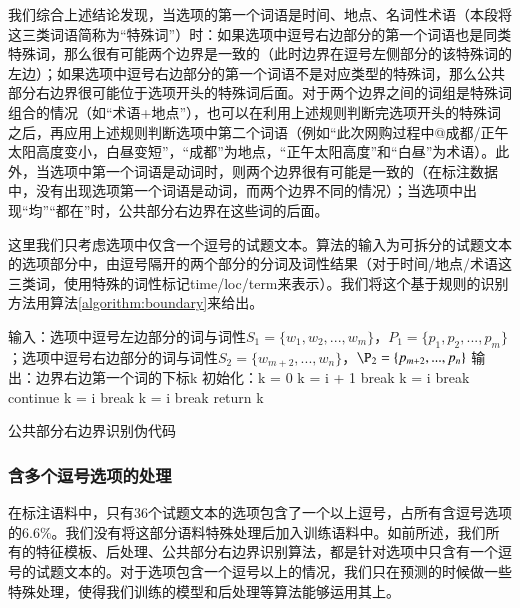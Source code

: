 \documentclass[master, winfont]{njuthesis}
\begin{document}
我们综合上述结论发现，当选项的第一个词语是时间、地点、名词性术语（本段将这三类词语简称为“特殊词”）时：如果选项中逗号右边部分的第一个词语也是同类特殊词，那么很有可能两个边界是一致的（此时边界在逗号左侧部分的该特殊词的左边）；如果选项中逗号右边部分的第一个词语不是对应类型的特殊词，那么公共部分右边界很可能位于选项开头的特殊词后面。对于两个边界之间的词组是特殊词组合的情况（如“术语+地点”），也可以在利用上述规则判断完选项开头的特殊词之后，再应用上述规则判断选项中第二个词语（例如“此次网购过程中@成都/正午太阳高度变小，白昼变短”，“成都”为地点，“正午太阳高度”和“白昼”为术语）。此外，当选项中第一个词语是动词时，则两个边界很有可能是一致的（在标注数据中，没有出现选项第一个词语是动词，而两个边界不同的情况）；当选项中出现“均”“都在”时，公共部分右边界在这些词的后面。

这里我们只考虑选项中仅含一个逗号的试题文本。算法的输入为可拆分的试题文本的选项部分中，由逗号隔开的两个部分的分词及词性结果（对于时间/地点/术语这三类词，使用特殊的词性标记time/loc/term来表示）。我们将这个基于规则的识别方法用算法\ref{algorithm:boundary}来给出。

\begin{algorithm}
\begin{algorithmic}[1]
\STATE 输入：选项中逗号左边部分的词与词性$S_1=\{w_1, w_2, ..., w_m\}$，$P_1=\{p_1, p_2, ..., p_m\}$；选项中逗号右边部分的词与词性$S_2=\{w_{m+2}, ..., w_n\}$，$\P_2=\{p_{m+2}, ..., p_n\}$
\STATE 输出：边界右边第一个词的下标k
\STATE 初始化：k = 0
		\STATE k = i + 1
		\STATE break
		\STATE k = i
		\STATE break
		\STATE continue
		\STATE k = i
		\STATE break
	\ELSE
		\STATE k = i
    	\STATE break
    \ENDIF
    \STATE return k
\ENDFOR
\end{algorithmic}
\caption{\label{algorithm:boundary}公共部分右边界识别伪代码}
\end{algorithm}

\subsubsection{含多个逗号选项的处理}
在标注语料中，只有36个试题文本的选项包含了一个以上逗号，占所有含逗号选项的6.6\%。我们没有将这部分语料特殊处理后加入训练语料中。如前所述，我们所有的特征模板、后处理、公共部分右边界识别算法，都是针对选项中只含有一个逗号的试题文本的。对于选项包含一个逗号以上的情况，我们只在预测的时候做一些特殊处理，使得我们训练的模型和后处理等算法能够运用其上。
\end{document}
